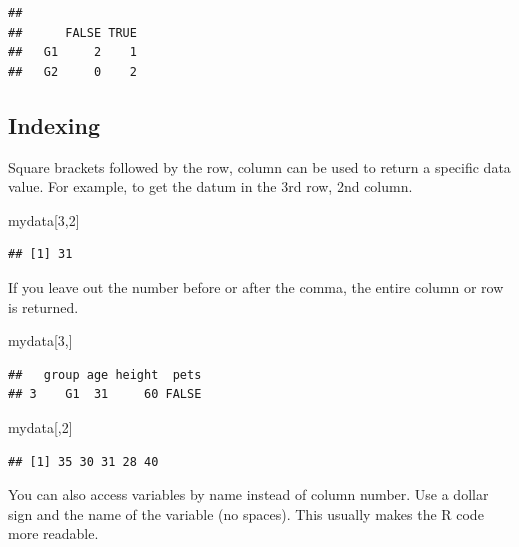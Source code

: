 \documentclass[
]{book}
\newenvironment{Shaded}{\begin{snugshade}}{\end{snugshade}}
\newcommand{\DecValTok}[1]{\textcolor[rgb]{0.00,0.00,0.81}{#1}}
\newcommand{\NormalTok}[1]{#1}
\newcommand{\OperatorTok}[1]{\textcolor[rgb]{0.81,0.36,0.00}{\textbf{#1}}}
\begin{document}
\begin{verbatim}
##     
##      FALSE TRUE
##   G1     2    1
##   G2     0    2
\end{verbatim}

\hypertarget{indexing}{%
\subsection*{Indexing}\label{indexing}}

Square brackets followed by the row, column can be used to return a specific data value. For example, to get the datum in the 3rd row, 2nd column.

\begin{Shaded}
\begin{Highlighting}[]
\NormalTok{mydata[}\DecValTok{3}\NormalTok{,}\DecValTok{2}\NormalTok{]}
\end{Highlighting}
\end{Shaded}

\begin{verbatim}
## [1] 31
\end{verbatim}

If you leave out the number before or after the comma, the entire column or row is returned.

\begin{Shaded}
\begin{Highlighting}[]
\NormalTok{mydata[}\DecValTok{3}\NormalTok{,]}
\end{Highlighting}
\end{Shaded}

\begin{verbatim}
##   group age height  pets
## 3    G1  31     60 FALSE
\end{verbatim}

\begin{Shaded}
\begin{Highlighting}[]
\NormalTok{mydata[,}\DecValTok{2}\NormalTok{]}
\end{Highlighting}
\end{Shaded}

\begin{verbatim}
## [1] 35 30 31 28 40
\end{verbatim}

You can also access variables by name instead of column number. Use a dollar sign and the name of the variable (no spaces). This usually makes the R code more readable.

\begin{Shaded}
\end{Shaded}
\end{document}
